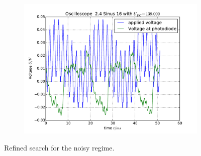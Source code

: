 \begin{figure}
\begin{subfigure}[b]{\picwidth}
        \caption{}
    \end{subfigure}
    \begin{subfigure}[b]{\picwidth}
        \includegraphics[width=\textwidth]{analysis/figures/24sinus16}
        \caption{}
    \end{subfigure}
    \caption{Refined search for the noisy regime.}
    \label{fig:sinus9}
\end{figure}
